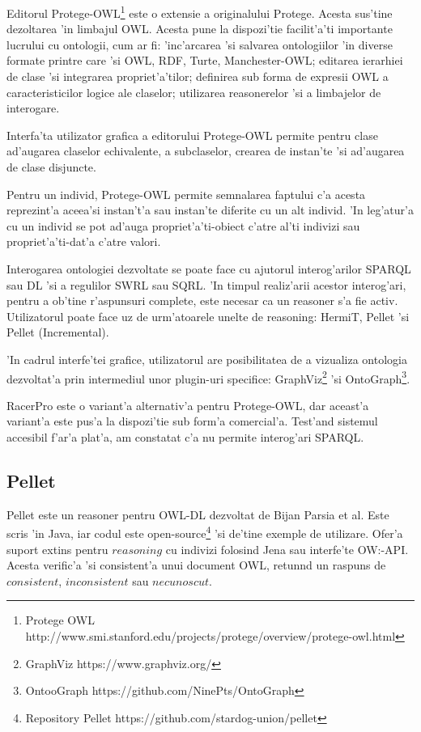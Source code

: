 \documentclass[12pt,a4paper,twoside]{report}
\begin{document}
Editorul Protege-OWL\footnote{Protege OWL http://www.smi.stanford.edu/projects/protege/overview/protege-owl.html} este o extensie a originalului Protege. Acesta sus'tine dezoltarea 'in limbajul OWL. Acesta pune la dispozi'tie facilit'a'ti importante lucrului cu ontologii, cum ar fi: 'inc'arcarea 'si salvarea ontologiilor 'in diverse formate printre care 'si OWL, RDF, Turte, Manchester-OWL; editarea ierarhiei de clase 'si integrarea propriet'a'tilor; definirea sub forma de expresii OWL a caracteristicilor logice ale claselor; utilizarea reasonerelor 'si a limbajelor de interogare.

Interfa'ta utilizator grafica a editorului Protege-OWL permite pentru clase ad'augarea claselor echivalente, a subclaselor, crearea de instan'te 'si ad'augarea de clase disjuncte. 

Pentru un individ, Protege-OWL permite semnalarea faptului c'a acesta reprezint'a aceea'si instan't'a sau instan'te diferite cu un alt individ. 'In leg'atur'a cu un individ se pot ad'auga propriet'a'ti-obiect c'atre al'ti indivizi sau propriet'a'ti-dat'a c'atre valori.

Interogarea ontologiei dezvoltate se poate face cu ajutorul interog'arilor SPARQL sau DL 'si a regulilor SWRL sau SQRL. 'In timpul realiz'arii acestor interog'ari, pentru a ob'tine r'aspunsuri complete, este necesar ca un reasoner s'a fie activ. Utilizatorul poate face uz de urm'atoarele unelte de reasoning: HermiT, Pellet 'si Pellet (Incremental).

'In cadrul interfe'tei grafice, utilizatorul are posibilitatea de a vizualiza ontologia dezvoltat'a prin intermediul unor plugin-uri specifice: GraphViz\footnote{GraphViz https://www.graphviz.org/} 'si OntoGraph\footnote{OntooGraph https://github.com/NinePts/OntoGraph}.


RacerPro este o variant'a alternativ'a pentru Protege-OWL, dar aceast'a variant'a este pus'a la dispozi'tie sub form'a comercial'a. Test'and sistemul accesibil f'ar'a plat'a, am constatat c'a nu permite interog'ari SPARQL.



\subsection{Pellet}
\label{sec:pellet}

Pellet \cite{SirinPellet:Reasoner} este un reasoner pentru OWL-DL dezvoltat de Bijan Parsia et al. Este scris 'in Java, iar codul este open-source\footnote{Repository Pellet https://github.com/stardog-union/pellet} 'si de'tine exemple de utilizare. Ofer'a suport extins pentru $reasoning$ cu indivizi folosind Jena sau interfe'te OW:-API. Acesta verific'a 'si consistent'a unui document OWL, retun\ia nd un raspuns de $consistent$, $inconsistent$ sau $necunoscut$.
\end{document}
